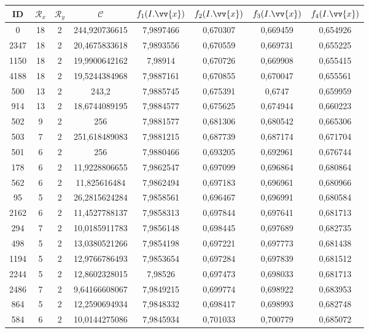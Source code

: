 \scriptsize
\begin{longtable}{|c|c|c|c|c|c|c|c|}
\hline
ID & $\mathscr{R}_x$ & $\mathscr{R}_y$ & $\mathscr{C}$ & $f_1(I.\vv{x})$ & $f_2(I.\vv{x})$ & $f_3(I.\vv{x})$ & $f_4(I.\vv{x})$ \\
\hline
0 & 18 & 2 & 244,920736615 & 7,9897466 & 0,670307 & 0,669459 & 0,654926 \\
2347 & 18 & 2 & 20,4675833618 & 7,9893556 & 0,670559 & 0,669731 & 0,655225 \\
1150 & 18 & 2 & 19,9900642162 & 7,98914 & 0,670726 & 0,669908 & 0,655415 \\
4188 & 18 & 2 & 19,5244384968 & 7,9887161 & 0,670855 & 0,670047 & 0,655561 \\
500 & 13 & 2 & 243,2 & 7,9885745 & 0,675391 & 0,6747 & 0,659959 \\
914 & 13 & 2 & 18,6744089195 & 7,9884577 & 0,675625 & 0,674944 & 0,660223 \\
502 & 9 & 2 & 256 & 7,9881577 & 0,681306 & 0,680542 & 0,665306 \\
503 & 7 & 2 & 251,618489083 & 7,9881215 & 0,687739 & 0,687174 & 0,671704 \\
501 & 6 & 2 & 256 & 7,9880466 & 0,693205 & 0,692961 & 0,676744 \\
178 & 6 & 2 & 11,9228806655 & 7,9862547 & 0,697099 & 0,696864 & 0,680864 \\
562 & 6 & 2 & 11,825616484 & 7,9862494 & 0,697183 & 0,696961 & 0,680966 \\
95 & 5 & 2 & 26,2815624284 & 7,9858561 & 0,696467 & 0,696991 & 0,680584 \\
2162 & 6 & 2 & 11,4527788137 & 7,9858313 & 0,697844 & 0,697641 & 0,681713 \\
294 & 7 & 2 & 10,0185911783 & 7,9856148 & 0,698445 & 0,697689 & 0,682735 \\
498 & 5 & 2 & 13,0380521266 & 7,9854198 & 0,697221 & 0,697773 & 0,681438 \\
1194 & 5 & 2 & 12,9766786493 & 7,9853654 & 0,697284 & 0,697839 & 0,681512 \\
2244 & 5 & 2 & 12,8602328015 & 7,98526 & 0,697473 & 0,698033 & 0,681713 \\
2486 & 7 & 2 & 9,64166608067 & 7,9849215 & 0,699774 & 0,698922 & 0,683953 \\
864 & 5 & 2 & 12,2590694934 & 7,9848332 & 0,698417 & 0,698993 & 0,682748 \\
584 & 6 & 2 & 10,0144275086 & 7,9845934 & 0,701033 & 0,700779 & 0,685072 \\

\end{longtable}
